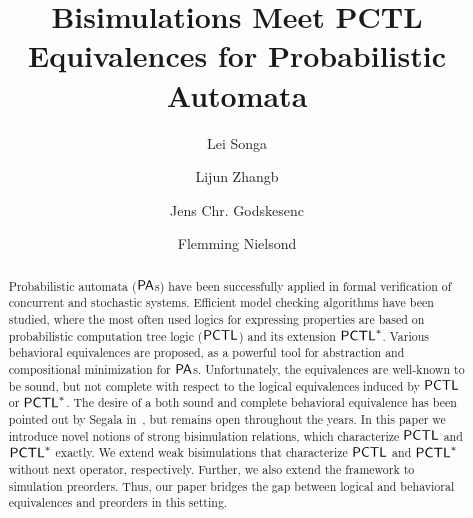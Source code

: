 \documentclass{LMCS}
\newcommand{\PA}{{\sf PA}}
\newcommand{\PCTL}{{\sf PCTL}}
\begin{document}
\title[Bisimulations Meet PCTL Equivalences for Probabilistic Automata]{Bisimulations Meet PCTL Equivalences for Probabilistic Automata\rsuper*}

\author[L.~Song]{Lei Song\rsuper a}	\address{{\lsuper a}Max-Planck-Institut f\"{u}r Informatik, and
Saarland University -- Computer Science, Germany}	   

\author[L.~Zhang]{Lijun Zhang\rsuper b}	\address{{\lsuper b}State Key Laboratory of Computer Science, Institute of Software, Chinese Academy of Sciences,
DTU Informatics,  Technical University of Denmark, and
Saarland University -- Computer Science, Germany}	   

\author[J. C. Godskesen]{Jens Chr. Godskesen\rsuper c}	\address{{\lsuper c}IT University of Copenhagen, Denmark}	   

\author[F. Nielson]{Flemming Nielson\rsuper d}	\address{{\lsuper d}DTU Compute,  Technical University of Denmark}	  



\begin{abstract}
  Probabilistic automata ($\PA$s) have been successfully applied in
  formal verification of concurrent and stochastic systems. Efficient
  model checking algorithms have been studied, where the most often
  used logics for expressing properties are based on probabilistic computation tree logic ($\PCTL$) and its
  extension $\PCTL^{*}$. Various behavioral equivalences are proposed,
  as a powerful tool for abstraction and compositional minimization
  for $\PA$s. Unfortunately, the equivalences are
  well-known to be sound, but not complete with respect to the logical
  equivalences induced by $\PCTL$ or $\PCTL^{*}$.  The desire of a
  both sound and complete behavioral equivalence has been pointed
  out by Segala in~\cite{Segala-thesis}, but remains open throughout
  the years.  In this paper we introduce novel notions
  of strong bisimulation relations, which characterize $\PCTL$ and
  $\PCTL^{*}$ exactly. We extend weak bisimulations that characterize $\PCTL$
  and $\PCTL^{*}$ without next operator, respectively.  Further, we
  also extend the framework to simulation preorders. Thus, our paper bridges
  the gap between logical and behavioral equivalences and preorders in this setting.
\end{abstract}
\maketitle
\end{document}
